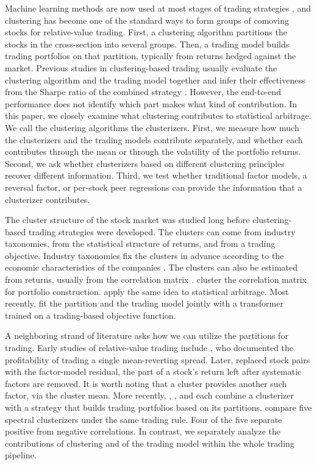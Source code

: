 Machine learning methods are now used at most stages of trading
strategies \citep{kelly2023financial}, and clustering has become one of
the standard ways to form groups of comoving stocks for relative-value trading. First,
a clustering algorithm partitions the stocks in the cross-section into several groups.
Then, a trading model builds trading portfolios on that partition, typically from returns hedged against the market. Previous studies in clustering-based trading usually evaluate the clustering algorithm and the trading model together and infer their effectiveness from the Sharpe ratio of the combined strategy \citep{Jinetal2023, LeeChang2026, brutti2026orthogonal}. However, the end-to-end performance does not identify which part makes what kind of contribution. In this paper, we closely examine what clustering contributes to statistical arbitrage. We call the clustering algorithms the clusterizers. First, we measure how much the clusterizers and the trading models contribute separately, and whether each contributes through the mean or through the volatility of the portfolio returns. Second, we ask whether clusterizers based on different clustering principles recover different information. Third, we test whether traditional factor models, a reversal factor, or per-stock peer regressions can provide the information that a clusterizer contributes.

The cluster structure of the stock market was studied long before clustering-based trading strategies were developed. The clusters can come from industry taxonomies, from the statistical structure of returns, and from a trading objective. Industry taxonomies fix the clusters in advance according to the economic characteristics of the companies
\citep{bhojraj2003whats}. The clusters can also be estimated from
returns, usually from the correlation matrix \citep{Mantegna1999}.
\citet{TOLA2008235} cluster the correlation matrix for portfolio construction.
\citet{Jinetal2023} apply the same idea to statistical arbitrage. Most recently, \citet{LeeChang2026} fit the partition and the trading model jointly with a transformer trained on a trading-based objective function.

A neighboring strand of literature asks how we can utilize the partitions for trading.
Early studies of relative-value trading include \citet{Gatevetal2006}, who documented the profitability of trading a single mean-reverting spread. Later, \citet{avellaneda2010statistical} replaced stock pairs with the factor-model residual, the part of a stock's return left after systematic factors are removed. It is worth noting that a cluster provides another such factor, via the cluster mean. More recently, \citet{Jinetal2023}, \citet{LeeChang2026}, and
\citet{brutti2026orthogonal} each combine a clusterizer with a strategy that builds trading portfolios based on its partitions. \citet{Jinetal2023} compare five spectral clusterizers under the same trading rule. Four of the five separate positive from negative correlations. In contrast, we separately analyze the contributions of clustering and of the trading model within the whole trading pipeline.

